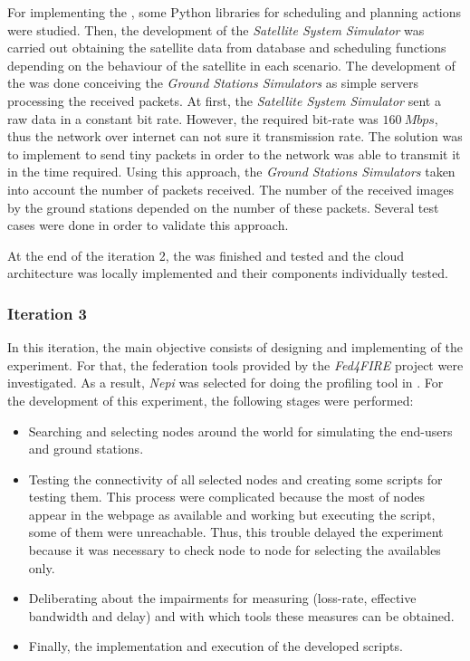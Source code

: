 For implementing the \sss, some Python libraries for scheduling and planning
actions were studied. Then, the development of the \emph{Satellite System
  Simulator} was carried out obtaining the satellite data from database and
scheduling functions depending on the behaviour of the satellite in each
scenario.
The development of the \gsss was done conceiving the \emph{Ground Stations
  Simulators} as simple servers processing the received packets.   
At first, the \emph{Satellite System Simulator}  sent a raw data in a constant
bit rate. However, the required bit-rate was $160~Mbps$, thus the network over internet
can not sure it transmission rate. The solution was to implement to send tiny
packets in order to the network was able to transmit it in the time required.    
Using this approach, the \emph{Ground Stations
  Simulators} taken into account the number of packets received. The number of
the received images by the ground stations depended on
the number of these packets. Several test cases were done in order to validate
this approach.

At the end of the iteration 2, the \sss was finished and tested and the cloud
architecture was locally implemented and their components individually tested.
 
\subsubsection{Iteration 3}

In this iteration, the main objective consists of designing and implementing of the
\pl experiment. For that, the federation tools provided by the \emph{Fed4FIRE}
project were investigated. As a result, \emph{Nepi} was selected for doing the
profiling tool in \pl. 
For the development of this experiment, the following stages were performed:
\begin{itemize}
\item Searching and selecting nodes around the world for simulating the
  end-users and ground stations.
\item Testing the connectivity of all selected nodes and creating some scripts
  for testing them. This process were complicated because the most of nodes
  appear in the \pl webpage as available and working but executing the script,
  some of them were unreachable. Thus, this trouble delayed the experiment
  because it was necessary to check node to node for selecting the availables only.
\item Deliberating about the impairments for measuring (loss-rate, effective
  bandwidth and delay) and with which tools these measures can be obtained. 
\item Finally, the implementation and execution of the developed scripts.
\end{itemize}


